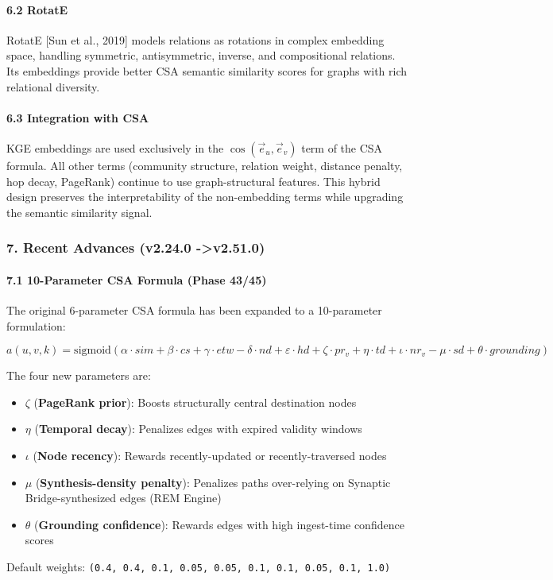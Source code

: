 \paragraph{6.2 RotatE}
RotatE [Sun et al., 2019] models relations as rotations in complex embedding space, handling symmetric, antis\-ymmetric, inverse, and compo\-sitional relations. Its embeddings provide better CSA semantic similarity scores for graphs with rich relational diversity.

\paragraph{6.3 Integration with CSA}
KGE embeddings are used exclusively in the $\cos(\vec{e}_u, \vec{e}_v)$ term of the CSA formula. All other terms (community structure, relation weight, distance penalty, hop decay, PageRank) continue to use graph-structural features. This hybrid design preserves the inter\-pretability of the non-embedding terms while upgrading the semantic similarity signal.

\subsubsection{7. Recent Advances (v2.24.0 -\textgreater  v2.51.0)}

\paragraph{7.1 10-Parameter CSA Formula (Phase 43/45)}
The original 6-parameter CSA formula has been expanded to a 10-parameter formulation:

\begin{equation}
a(u,v,k) = \text{sigmoid}(\alpha \cdot sim + \beta \cdot cs + \gamma \cdot etw - \delta \cdot nd + \varepsilon \cdot hd + \zeta \cdot pr_v + \eta \cdot td + \iota \cdot nr_v - \mu \cdot sd + \theta \cdot grounding)
\end{equation}

The four new parameters are:
\begin{itemize}
\item $\zeta$ (\textbf{PageRank prior}): Boosts struc\-turally central destination nodes
\item $\eta$ (\textbf{Temporal decay}): Penalizes edges with expired validity windows
\item $\iota$ (\textbf{Node recency}): Rewards recently-updated or recently-traversed nodes
\item $\mu$ (\textbf{Synthesis-density penalty}): Penalizes paths over-relying on Synaptic Bridge-synthesized edges (REM Engine)
\item $\theta$ (\textbf{Grounding confidence}): Rewards edges with high ingest-time confidence scores

\end{itemize}
Default weights: \texttt{(0.4, 0.4, 0.1, 0.05, 0.05, 0.1, 0.1, 0.05, 0.1, 1.0)}


